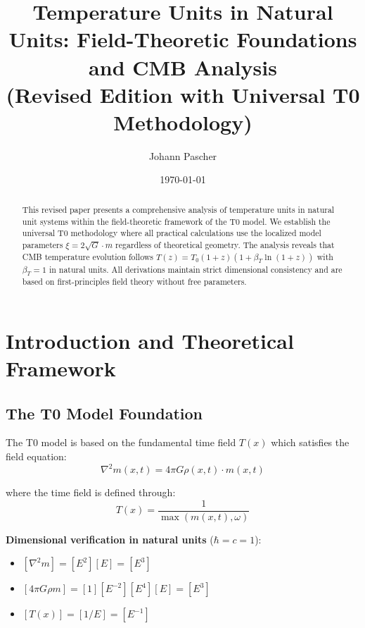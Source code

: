 \documentclass[12pt,a4paper]{article}
\newcommand{\Tfield}{T(x)}
\begin{document}
	
	\title{Temperature Units in Natural Units: Field-Theoretic Foundations and CMB Analysis \\
		(Revised Edition with Universal T0 Methodology)}
	\author{Johann Pascher}
	\date{\today}
	
	\maketitle
	
	\begin{abstract}
		This revised paper presents a comprehensive analysis of temperature units in natural unit systems within the field-theoretic framework of the T0 model. We establish the universal T0 methodology where all practical calculations use the localized model parameters $\xi = 2\sqrt{G} \cdot m$ regardless of theoretical geometry. The analysis reveals that CMB temperature evolution follows $T(z) = T_0(1+z)(1 + \beta_T \ln(1+z))$ with $\beta_T = 1$ in natural units. All derivations maintain strict dimensional consistency and are based on first-principles field theory without free parameters.
	\end{abstract}
	
	\tableofcontents
	\newpage
	
	\section{Introduction and Theoretical Framework}
	\label{sec:introduction}
	
	\subsection{The T0 Model Foundation}
	\label{subsec:t0_foundation}
	
	The T0 model is based on the fundamental time field $\Tfield$ which satisfies the field equation:
	\begin{equation}
		\nabla^2 m(x,t) = 4\pi G \rho(x,t) \cdot m(x,t)
	\end{equation}
	
	where the time field is defined through:
	\begin{equation}
		\Tfield = \frac{1}{\max(m(x,t), \omega)}
	\end{equation}
	
	\textbf{Dimensional verification in natural units} ($\hbar = c = 1$):
	\begin{itemize}
		\item $[\nabla^2 m] = [E^2][E] = [E^3]$
		\item $[4\pi G \rho m] = [1][E^{-2}][E^4][E] = [E^3]$ \checkmark
		\item $[\Tfield] = [1/E] = [E^{-1}]$ \checkmark
	\end{itemize}
\end{document}
